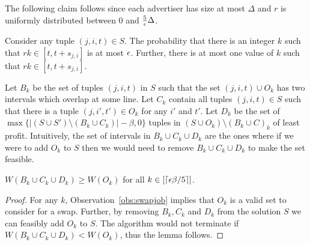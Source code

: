 
The following claim follows since each advertiser has size at most $\Delta$ and $r$ is uniformly distributed between $0$ and $\frac{5}{\epsilon} \Delta$.

\begin{claim}
\label{claim:probjob}
Consider any tuple $(j,i,t) \in S$.  The probability that there is an integer $k$ such that $rk \in [t,t+s_{j,i}]$ is at most $\epsilon$.  Further, there is at most one value of $k$ such that $rk \in [t,t+s_{j,i}]$.
\end{claim}

Let $B_k$ be the set of tuples $(j,i,t)$ in $S$ such that the set $(j,i,t) \cup O_k$ has two intervals which overlap at some line.  Let $C_k$ contain all tuples $(j,i,t) \in S$ such that  there is a tuple $(j,i',t')\in O_k$ for any $i'$ and $t'$. Let $D_k$ be the set of $\max\{|(S\cup S') \setminus (B_k\cup C_k)| - \beta,0\}$ tuples in $(S\cup O_k) \setminus (B_k\cup C)_k$ of least profit.  Intuitively, the set of intervals in $B_k \cup C_k \cup D_k$ are the ones where if we were to add $O_k$ to $S$ then we would need to remove $B_k \cup C_k \cup D_k$ to make the set feasible.

\begin{lemma}
\label{lem:swapboundjob}
$W(B_k \cup C_k \cup D_k) \geq W(O_k)$ for all $k \in [ \lceil \epsilon \beta / 5 \rceil]$.
\end{lemma}
\begin{proof}
For any $k$, Observation~\ref{obs:swapjob} implies that $O_k$ is a valid set to consider for a swap.  Further, by removing $B_k, C_k$ and $D_k$ from the solution $S$ we can feasibly add $O_k$ to $S$.  The algorithm would not terminate if $W(B_k \cup C_k \cup D_k) < W(O_k)$, thus the lemma follows.




\end{proof}

